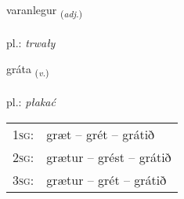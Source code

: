\documentclass[frontgrid, backgrid]{flacards}\usepackage[]{graphicx}\usepackage[]{xcolor}
\begin{document}
\renewcommand{\flhead}{\vskip5pt \fboxsep=0pt {\small\bfseries\footnotesize Lýsingarorð | Adjective}}
\renewcommand{\fcfoot}{\vskip5pt \fboxsep=0pt \hspace{2pt}{\small\bfseries\footnotesize 2K}}

\renewcommand{\blhead}{\vskip5pt {\small\bfseries\footnotesize Lýsingarorð | Adjective }}
\renewcommand{\bcfoot}{\vskip5pt \hspace{2pt}{\small\bfseries\footnotesize 2K}}


{varanlegur \small{\textsubscript{(\textit{adj.})}} \\[1ex] %
\textphonetic{[vaːranlɛɣʏr]} \\
pl.: \emph{trwały} \\  [2ex]
\renewcommand*{\arraystretch}{0.8}
}

\renewcommand{\flhead}{\vskip5pt \fboxsep=0pt {\small\bfseries\footnotesize Sagnorð | Verb}}
\renewcommand{\fcfoot}{\vskip5pt \fboxsep=0pt \hspace{2pt}{\small\bfseries\footnotesize 2K}}

\renewcommand{\blhead}{\vskip5pt {\small\bfseries\footnotesize Sagnorð | Verb }}
\renewcommand{\bcfoot}{\vskip5pt \hspace{2pt}{\small\bfseries\footnotesize 2K}}


{gráta \small{\textsubscript{(\textit{v.})}} \\[1ex] %
\textphonetic{[krauːta]} \\
pl.: \emph{płakać} \\  [2ex]
\renewcommand*{\arraystretch}{0.8}
\begin{tabular}{p{1cm}l}
\textsc{1sg}: & græt -- grét -- grátið \\ 
\textsc{2sg}: & grætur -- grést -- grátið \\ 
\textsc{3sg}: & grætur -- grét -- grátið \\ 
\end{tabular}
}
\end{document}
